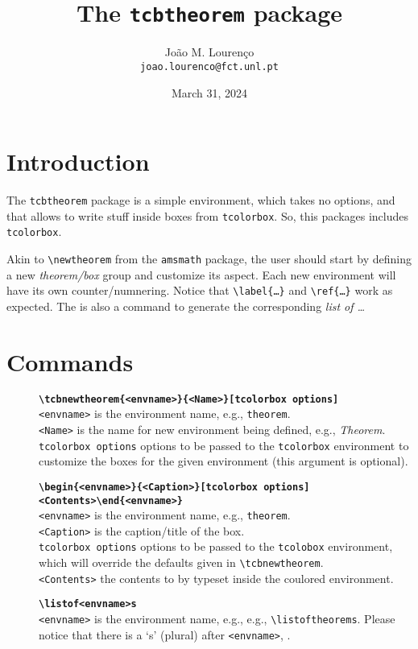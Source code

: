\documentclass{article}
\newcommand\tcthrm{\texttt{tcbtheorem}\xspace}
\begin{document}
  \title{The \tcthrm package}
  \author{João M. Lourenço\\\texttt{\small joao.lourenco@fct.unl.pt}}
  \date{March 31, 2024}
  
  \maketitle
  

\section{Introduction}
\label{sec:introduction}

The \tcthrm package is a simple environment, which takes no options, and that allows to write stuff inside boxes from \texttt{tcolorbox}.  So, this packages includes \texttt{tcolorbox}.

Akin to \verb!\newtheorem! from the \verb!amsmath! package, the user should start by defining a new \emph{theorem/box} group and customize its aspect. Each new environment will have its own counter/numnering. Notice that \verb!\label{…}! and \verb!\ref{…}! work as expected.  The is also a command to generate the corresponding \emph{list of …}

\section{Commands}
\label{sec:commands}

\begin{description}
  \item[]{\bfseries\verb+\tcbnewtheorem{<envname>}{<Name>}[tcolorbox options]+}\\
      \verb!<envname>! is the environment name, e.g., \verb!theorem!.\\
      \verb!<Name>! is the name for new environment being defined, e.g., \emph{Theorem}.\\
      \verb!tcolorbox options! options to be passed to the \verb!tcolorbox! environment to customize the boxes for the given environment (this argument is optional).
  \item[]{\bfseries\verb+\begin{<envname>}{<Caption>}[tcolorbox options]<Contents>\end{<envname>}+}\\
      \verb!<envname>! is the environment name, e.g., \verb!theorem!.\\
      \verb!<Caption>! is the caption/title of the box.\\
      \verb!tcolorbox options! options to be passed to the \verb!tcolobox! environment, which will override the defaults given in \verb!\tcbnewtheorem!.\\
      \verb!<Contents>! the contents to by typeset inside the coulored environment.\\
  \item[]{\bfseries\verb+\listof<envname>s+}\\
      \verb!<envname>! is the environment name, e.g., e.g., \verb!\listoftheorems!.  Please notice that there is a `s' (plural) after \verb!<envname>!, .
\end{description}
\end{document}
